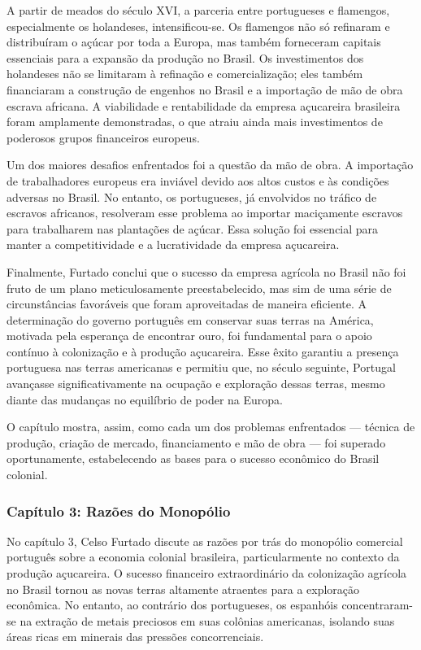 \documentclass[a4paper,12pt]{article}[abntex2]
\begin{document}
A partir de meados do século XVI, a parceria entre portugueses e flamengos, especialmente os holandeses, intensificou-se. Os flamengos não só refinaram e distribuíram o açúcar por toda a Europa, mas também forneceram capitais essenciais para a expansão da produção no Brasil. Os investimentos dos holandeses não se limitaram à refinação e comercialização; eles também financiaram a construção de engenhos no Brasil e a importação de mão de obra escrava africana. A viabilidade e rentabilidade da empresa açucareira brasileira foram amplamente demonstradas, o que atraiu ainda mais investimentos de poderosos grupos financeiros europeus.

Um dos maiores desafios enfrentados foi a questão da mão de obra. A importação de trabalhadores europeus era inviável devido aos altos custos e às condições adversas no Brasil. No entanto, os portugueses, já envolvidos no tráfico de escravos africanos, resolveram esse problema ao importar maciçamente escravos para trabalharem nas plantações de açúcar. Essa solução foi essencial para manter a competitividade e a lucratividade da empresa açucareira.

Finalmente, Furtado conclui que o sucesso da empresa agrícola no Brasil não foi fruto de um plano meticulosamente preestabelecido, mas sim de uma série de circunstâncias favoráveis que foram aproveitadas de maneira eficiente. A determinação do governo português em conservar suas terras na América, motivada pela esperança de encontrar ouro, foi fundamental para o apoio contínuo à colonização e à produção açucareira. Esse êxito garantiu a presença portuguesa nas terras americanas e permitiu que, no século seguinte, Portugal avançasse significativamente na ocupação e exploração dessas terras, mesmo diante das mudanças no equilíbrio de poder na Europa.

O capítulo mostra, assim, como cada um dos problemas enfrentados — técnica de produção, criação de mercado, financiamento e mão de obra — foi superado oportunamente, estabelecendo as bases para o sucesso econômico do Brasil colonial.

\subsubsection{\textbf{Capítulo 3: Razões do Monopólio}}

No capítulo 3, Celso Furtado discute as razões por trás do monopólio comercial português sobre a economia colonial brasileira, particularmente no contexto da produção açucareira. O sucesso financeiro extraordinário da colonização agrícola no Brasil tornou as novas terras altamente atraentes para a exploração econômica. No entanto, ao contrário dos portugueses, os espanhóis concentraram-se na extração de metais preciosos em suas colônias americanas, isolando suas áreas ricas em minerais das pressões concorrenciais.
\end{document}
